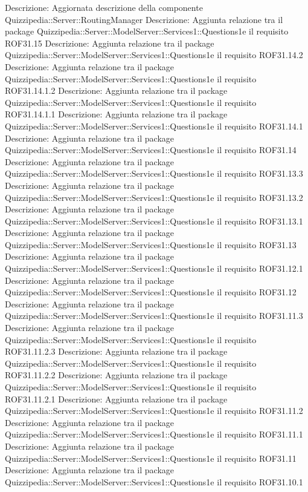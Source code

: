Descrizione: Aggiornata descrizione della componente Quizzipedia::Server::RoutingManager 
Descrizione: Aggiunta relazione tra il package Quizzipedia::Server::ModelServer::Services1::Questions1e il requisito ROF31.15 
Descrizione: Aggiunta relazione tra il package Quizzipedia::Server::ModelServer::Services1::Questions1e il requisito ROF31.14.2 
Descrizione: Aggiunta relazione tra il package Quizzipedia::Server::ModelServer::Services1::Questions1e il requisito ROF31.14.1.2 
Descrizione: Aggiunta relazione tra il package Quizzipedia::Server::ModelServer::Services1::Questions1e il requisito ROF31.14.1.1 
Descrizione: Aggiunta relazione tra il package Quizzipedia::Server::ModelServer::Services1::Questions1e il requisito ROF31.14.1 
Descrizione: Aggiunta relazione tra il package Quizzipedia::Server::ModelServer::Services1::Questions1e il requisito ROF31.14 
Descrizione: Aggiunta relazione tra il package Quizzipedia::Server::ModelServer::Services1::Questions1e il requisito ROF31.13.3 
Descrizione: Aggiunta relazione tra il package Quizzipedia::Server::ModelServer::Services1::Questions1e il requisito ROF31.13.2 
Descrizione: Aggiunta relazione tra il package Quizzipedia::Server::ModelServer::Services1::Questions1e il requisito ROF31.13.1 
Descrizione: Aggiunta relazione tra il package Quizzipedia::Server::ModelServer::Services1::Questions1e il requisito ROF31.13 
Descrizione: Aggiunta relazione tra il package Quizzipedia::Server::ModelServer::Services1::Questions1e il requisito ROF31.12.1 
Descrizione: Aggiunta relazione tra il package Quizzipedia::Server::ModelServer::Services1::Questions1e il requisito ROF31.12 
Descrizione: Aggiunta relazione tra il package Quizzipedia::Server::ModelServer::Services1::Questions1e il requisito ROF31.11.3 
Descrizione: Aggiunta relazione tra il package Quizzipedia::Server::ModelServer::Services1::Questions1e il requisito ROF31.11.2.3 
Descrizione: Aggiunta relazione tra il package Quizzipedia::Server::ModelServer::Services1::Questions1e il requisito ROF31.11.2.2 
Descrizione: Aggiunta relazione tra il package Quizzipedia::Server::ModelServer::Services1::Questions1e il requisito ROF31.11.2.1 
Descrizione: Aggiunta relazione tra il package Quizzipedia::Server::ModelServer::Services1::Questions1e il requisito ROF31.11.2 
Descrizione: Aggiunta relazione tra il package Quizzipedia::Server::ModelServer::Services1::Questions1e il requisito ROF31.11.1 
Descrizione: Aggiunta relazione tra il package Quizzipedia::Server::ModelServer::Services1::Questions1e il requisito ROF31.11 
Descrizione: Aggiunta relazione tra il package Quizzipedia::Server::ModelServer::Services1::Questions1e il requisito ROF31.10.1 
